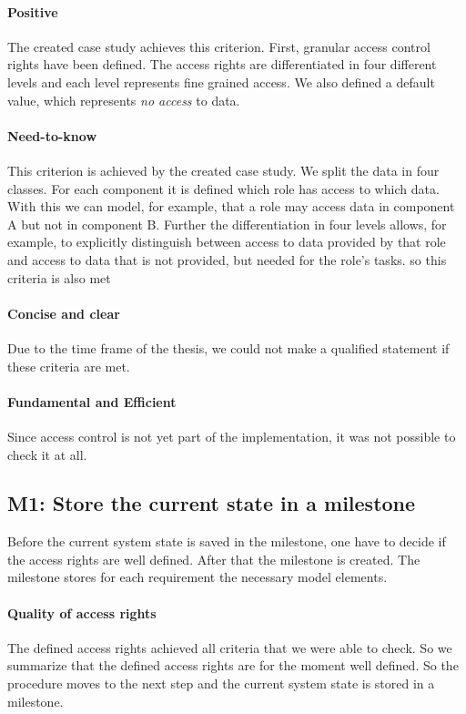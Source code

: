 \paragraph{Positive}
The created case study achieves this criterion. First, granular access control rights have been defined. The access rights are differentiated in four different levels and each level represents fine grained access. We also defined a default value, which represents \textit{no access} to data. 
\paragraph{Need-to-know}
This criterion is achieved by the created case study. We split the data in four classes. For each component it is defined which role has access to which data. With this we can model, for example, that a role may access data in component A but not in component B. Further the differentiation in four levels allows, for example, to explicitly distinguish between access to data provided by that role and access to data that is not provided, but needed for the role's tasks. so this criteria is also met 
\paragraph{Concise and clear}
Due to the time frame of the thesis, we could not make a qualified statement if these criteria are met.
\paragraph{Fundamental and Efficient}
Since access control is not yet part of the implementation, it was not possible to check it at all.
\subsection{M1: Store the current state in a milestone}
Before the current system state is saved in the milestone, one have to decide if the access rights are well defined. After that the milestone is created. The milestone stores for each requirement the necessary model elements.
\paragraph{Quality of access rights}
The defined access rights achieved all criteria that we were able to check. So we summarize that the defined access rights are for the moment well defined. So the procedure moves to the next step and the current system state is stored in a milestone.
